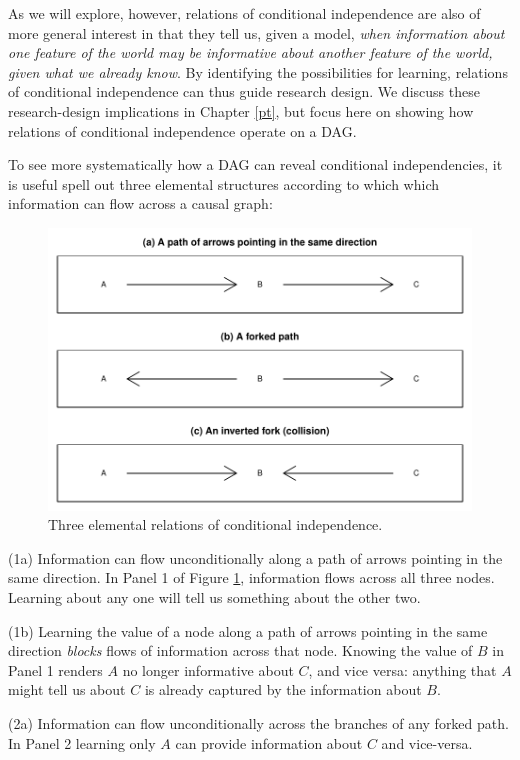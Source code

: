 \documentclass[
  12pt,
]{book}
\begin{document}
As we will explore, however, relations of conditional independence are also of more general interest in that they tell us, given a model, \emph{when information about one feature of the world may be informative about another feature of the world, given what we already know}. By identifying the possibilities for learning, relations of conditional independence can thus guide research design. We discuss these research-design implications in Chapter \ref{pt}, but focus here on showing how relations of conditional independence operate on a DAG.

To see more systematically how a DAG can reveal conditional independencies, it is useful spell out three elemental structures according to which which information can flow across a causal graph:

\begin{figure}

{\centering \includegraphics[width=0.7\linewidth]{ii_files/figure-latex/pathsexp-1} 

}

\caption{Three elemental relations of conditional independence.}\label{fig:pathsexp}
\end{figure}

(1a) Information can flow unconditionally along a path of arrows pointing in the same direction. In Panel 1 of Figure \ref{fig:pathsexp}, information flows across all three nodes. Learning about any one will tell us something about the other two.

(1b) Learning the value of a node along a path of arrows pointing in the same direction \emph{blocks} flows of information across that node. Knowing the value of \(B\) in Panel 1 renders \(A\) no longer informative about \(C\), and vice versa: anything that \(A\) might tell us about \(C\) is already captured by the information about \(B\).

(2a) Information can flow unconditionally across the branches of any forked path. In Panel 2 learning only \(A\) can provide information about \(C\) and vice-versa.
\end{document}

